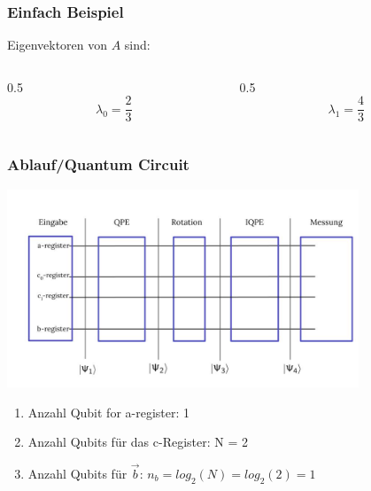 \begin{frame}
    \frametitle{Einfach Beispiel}

    Eigenvektoren von $A$ sind:    
    \begin{columns}[c]
        \begin{column}{0.5\hsize}\centering
            $$\lambda_0 = \frac{2}{3}$$
        \end{column}

        \begin{column}{0.5\hsize}
            $$\lambda_1 = \frac{4}{3}$$
        \end{column}
    \end{columns}

    \hfil

    \hfil


    \hfil

    \hfil



\end{frame}




\begin{frame}
    \frametitle{Ablauf/Quantum Circuit}

    \begin{center}
    \includegraphics[width=10.5cm]{img/example_circuit/example_circuit.jpg}
    \end{center}

    \begin{enumerate}
        \item Anzahl Qubit for a-register: 1
        \item Anzahl Qubits für das c-Register: N = 2
        \item Anzahl Qubits für $\vec{b}$: $n_b = log_2(N) = log_2 (2) = 1$ 
    \end{enumerate}
\end{frame}

